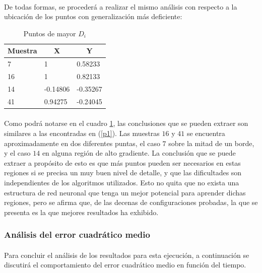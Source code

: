 \documentclass[12pt, twocolumn]{article}
\begin{document}
	\paragraph{} De todas formas, se procederá a realizar el mismo análisis con respecto a la ubicación de los puntos con generalización más deficiente:
	
	
	\begin{table}[H]
		\centering
		\begin{tabular}{lll}
			\hline
			Muestra & \multicolumn{1}{c}{X} & \multicolumn{1}{c}{Y} \\ \hline
			7      & 1             & 0.58233             \\
			16       & 1                    & 0.82133              \\
			14      & -0.14806                     & -0.35267              \\
			41       & 0.94275              & -0.24045             \\ \hline
		\end{tabular}
		\caption{Puntos de mayor $D_{i}$}
		\label{p2}
	\end{table}
	
	\paragraph{} Como podrá notarse en el cuadro \ref{p2}, las conclusiones que se pueden extraer son similares a las encontradas en (\ref{p1}). Las muestras $16$ y $41$ se encuentra aproximadamente en dos diferentes puntas, el caso $7$ sobre la mitad de un borde, y el caso $14$ en alguna región de alto gradiente. La conclusión que se puede extraer a propósito de esto es que más puntos pueden ser necesarios en estas regiones si se precisa un muy buen nivel de detalle, y que las dificultades son independientes de los algoritmos utilizados. Esto no quita que no exista una estructura de red neuronal que tenga un mejor potencial para aprender dichas regiones, pero se afirma que, de las decenas de configuraciones probadas, la que se presenta es la que mejores resultados ha exhibido. 
	
	\subsubsection{Análisis del error cuadrático medio}
	
	\paragraph{} Para concluir el análisis de los resultados para esta ejecución, a continuación se discutirá el comportamiento del error cuadrático medio en función del tiempo. 
	
\end{document}
